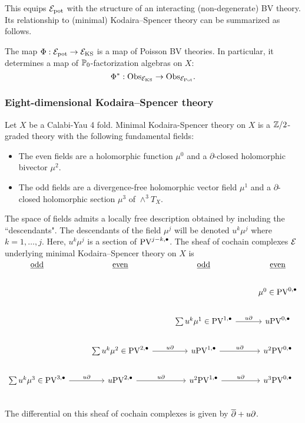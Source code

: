 \documentclass[11pt]{amsart}
\def\PV{{\rm PV}}
\begin{document}
This equips $\mathcal E_{\rm pot}$ with the structure of an interacting (non-degenerate) BV theory.
Its relationship to (minimal) Kodaira--Spencer theory can be summarized as follows.

\begin{prop}
  The map $\Phi : \mathcal E_{\rm pot} \to \mathcal E_{\rm KS}$ is a map of Poisson BV theories.
  In particular, it determines a map of $\mathbb P_0$-factorization algebras on $X$:
\[
\Phi^* : {\rm Obs}_{\mathcal E_{\rm KS}} \to {\rm Obs}_{\mathcal E_{\rm Pot}} .
\]
\end{prop}

\subsubsection{Eight-dimensional Kodaira--Spencer theory}
\label{sec:orgeb2dd4d}

Let \(X\) be a Calabi-Yau 4 fold. Minimal Kodaira-Spencer theory on $X$ is a $\mathbb Z/2$-graded theory with the following fundamental fields:
\begin{itemize}
\item The even fields are a holomorphic function $\mu^0$ and a $\partial$-closed holomorphic bivector $\mu^2$.
\item The odd fields are a divergence-free holomorphic vector field $\mu^1$ and a $\partial$-closed holomorphic section $\mu^3$ of $\wedge^3 T_X$.
\end{itemize}

The space of fields admits a locally free description obtained by including the ``descendants". The descendants of the field $\mu^j$ will be denoted $u^k \mu^j$ where $k = 1,\ldots, j$.
Here, $u^k \mu^j$ is a section of $\PV^{j - k, \bu}$.
The sheaf of cochain complexes $\mathcal E$ underlying minimal Kodaira--Spencer theory on $X$ is
\[\begin{tikzcd}
\ul{\rm odd} & \ul{\rm even} & \ul{\rm odd} & \ul{\rm even} \\
& & & \mu^0 \in \PV^{0,\bu} \\
& & \sum u^k \mu^1 \in \PV^{1,\bu} \ar[r, "u \partial"] & u \PV^{0,\bu} \\
& \sum u^k \mu^2 \in  \PV^{2,\bu} \ar[r,"u \partial"] & u \PV^{1,\bu} \ar[r, "u \partial"] & u^2 \PV^{0,\bu} \\
\sum u^k \mu^3 \in \PV^{3,\bu} \ar[r, "u \partial"]& u \PV^{2,\bu} \ar[r,"u \partial"] & u^2 \PV^{1,\bu} \ar[r, "u \partial"] & u^3\PV^{0,\bu} \\
\end{tikzcd}
\]
The differential on this sheaf of cochain complexes is given by $\overline{\partial} + u \partial$.
\end{document}
